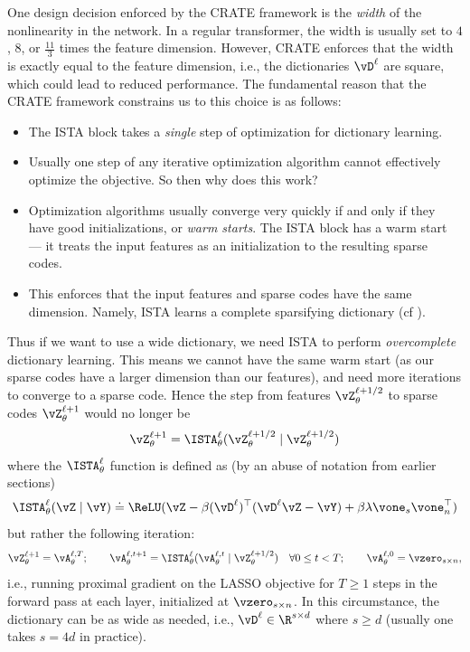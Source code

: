 \documentclass[../../book-main.tex]{subfiles}
\begin{document}
One design decision enforced by the CRATE framework is the
\textit{width} of the nonlinearity in the network. In a regular
transformer, the width is usually set to \(4\), \(8\), or
\(\frac{11}{3}\) times the feature dimension. However, CRATE enforces
that the width is exactly equal to the feature dimension, i.e., the
dictionaries \(\vD^{\ell}\) are square, which could lead to reduced
performance. The fundamental reason that the CRATE framework
constrains us to this choice is as follows:
\begin{itemize}
\item The ISTA block takes a \textit{single} step of optimization for
dictionary learning.
\item Usually one step of any iterative optimization algorithm cannot
effectively optimize the objective. So then why does this work?
\item Optimization algorithms usually converge very quickly if and
only if they have good initializations, or \textit{warm starts}. The
ISTA block has a warm start --- it treats the input features as an
initialization to the resulting sparse codes.
\item This enforces that the input features and sparse codes have the
same dimension. Namely, ISTA learns a complete sparsifying dictionary
(cf ).
\end{itemize}
Thus if we want to use a wide dictionary, we need ISTA to perform
\textit{overcomplete} dictionary learning. This means we cannot have
the same warm start (as our sparse codes have a larger dimension than
our features), and need more iterations to converge to a sparse code.
Hence the step from features \(\vZ_{\theta}^{\ell + 1/2}\) to sparse
codes \(\vZ_{\theta}^{\ell + 1}\) would no longer be
\begin{equation}
\vZ_{\theta}^{\ell + 1} = \ISTA_{\theta}^{\ell}(\vZ_{\theta}^{\ell +
1/2} \mid \vZ_{\theta}^{\ell + 1/2})
\end{equation}
where the \(\ISTA_{\theta}^{\ell}\) function is defined as (by an
abuse of notation from earlier sections)
\begin{equation}
\ISTA_{\theta}^{\ell}(\vZ \mid \vY) \doteq \ReLU(\vZ - \beta
(\vD^{\ell})^{\top}(\vD^{\ell}\vZ - \vY) + \beta \lambda
\vone_{s}\vone_{n}^{\top})
\end{equation}
but rather the following iteration:
\begin{equation}
\vZ_{\theta}^{\ell + 1} = \vA_{\theta}^{\ell, T}; \qquad
\vA_{\theta}^{\ell, t + 1} =
\ISTA_{\theta}^{\ell}(\vA_{\theta}^{\ell, t} \mid \vZ_{\theta}^{\ell
+ 1/2}) \quad \forall 0 \leq t < T; \qquad \vA_{\theta}^{\ell, 0} =
\vzero_{s \times n},
\end{equation}
i.e., running proximal gradient on the LASSO objective for \(T \geq
1\) steps in the forward pass at each layer, initialized at
\(\vzero_{s \times n}\). In this circumstance, the dictionary can be
as wide as needed, i.e., \(\vD^{\ell} \in \R^{s \times d}\) where \(s
\geq d\) (usually one takes \(s = 4d\) in practice).
\end{document}
